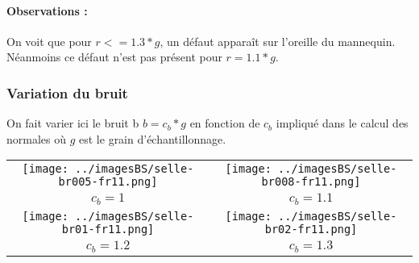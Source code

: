 \documentclass[11pt,a4paper]{article}
\begin{document}
\paragraph{Observations :}On voit que pour $r<=1.3*g$, un défaut apparaît sur l'oreille du mannequin. Néanmoins ce défaut n'est
pas présent pour $r=1.1*g$.

\pagebreak

\subsubsection{Variation du bruit}
On fait varier ici le bruit b $b=c_b*g$ en fonction de $c_b$ impliqué dans le calcul des normales où $g$ est le grain d'échantillonnage.

\begin{center}
\begin{tabular}{|c|c|}
\hline
\texttt{[image: ../imagesBS/selle-br005-fr11.png]} & \texttt{[image: ../imagesBS/selle-br008-fr11.png]}\\
$c_b=1$                                                       & $c_b=1.1$\\
\hline
\texttt{[image: ../imagesBS/selle-br01-fr11.png]} & \texttt{[image: ../imagesBS/selle-br02-fr11.png]}\\
$c_b=1.2$                                                     & $c_b=1.3$\\
\hline
\end{tabular}
\end{center}


 
\end{document}
